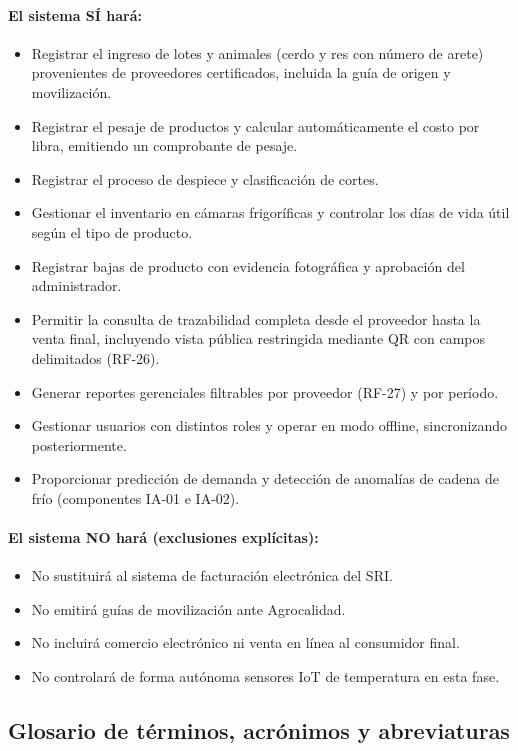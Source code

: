 \documentclass[11pt,a4paper]{article}
\begin{document}
\paragraph{El sistema SÍ hará:}
\begin{itemize}[nosep]
\item Registrar el ingreso de lotes y animales (cerdo y res con número de arete) provenientes de proveedores certificados, incluida la guía de origen y movilización.
\item Registrar el pesaje de productos y calcular automáticamente el costo por libra, emitiendo un comprobante de pesaje.
\item Registrar el proceso de despiece y clasificación de cortes.
\item Gestionar el inventario en cámaras frigoríficas y controlar los días de vida útil según el tipo de producto.
\item Registrar bajas de producto con evidencia fotográfica y aprobación del administrador.
\item Permitir la consulta de trazabilidad completa desde el proveedor hasta la venta final, incluyendo vista pública restringida mediante QR con campos delimitados (RF-26).
\item Generar reportes gerenciales filtrables por proveedor (RF-27) y por período.
\item Gestionar usuarios con distintos roles y operar en modo offline, sincronizando posteriormente.
\item Proporcionar predicción de demanda y detección de anomalías de cadena de frío (componentes IA-01 e IA-02).
\end{itemize}

\paragraph{El sistema NO hará (exclusiones explícitas):}
\begin{itemize}[nosep]
\item No sustituirá al sistema de facturación electrónica del SRI.
\item No emitirá guías de movilización ante Agrocalidad.
\item No incluirá comercio electrónico ni venta en línea al consumidor final.
\item No controlará de forma autónoma sensores IoT de temperatura en esta fase.
\end{itemize}

\subsection{Glosario de términos, acrónimos y abreviaturas}
\end{document}
